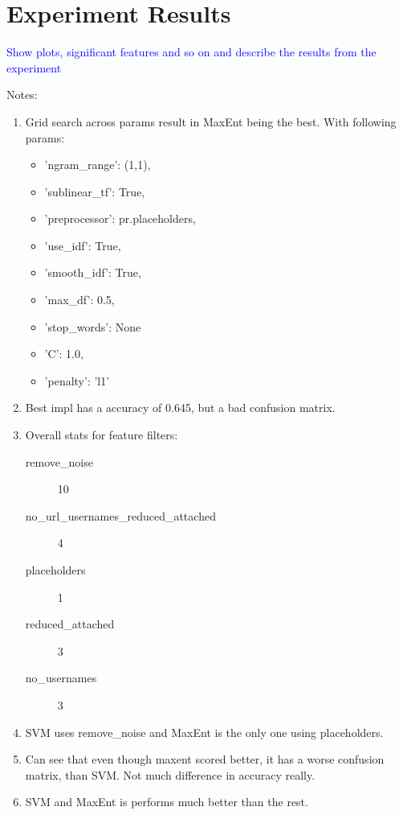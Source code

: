 \section{Experiment Results}
\textcolor{blue}{Show plots, significant features and so on and describe the results from the experiment}

Notes:
\begin{enumerate}
\item Grid search across params result in MaxEnt being the best. With following params:
	\begin{itemize}
		\item 'ngram\_range': (1,1),
		\item  'sublinear\_tf': True,
		\item  'preprocessor': pr.placeholders,
		\item  'use\_idf': True,
		\item  'smooth\_idf': True,
		\item  'max\_df': 0.5,
		\item  'stop\_words': None
	\end{itemize}
	\begin{itemize}
		\item 'C': 1.0,
		\item 'penalty': 'l1'
	\end{itemize}

\item Best impl has a accuracy of 0.645, but a bad confusion matrix.

\item Overall stats for feature filters:
	\begin{description}
		\item[remove\_noise] 10
		\item[no\_url\_usernames\_reduced\_attached] 4
		\item[placeholders] 1
		\item[reduced\_attached] 3
		\item[no\_usernames] 3
	\end{description}

\item SVM uses remove\_noise and MaxEnt is the only one using placeholders. 

\item Can see that even though maxent scored better, it has a worse confusion matrix, than SVM. Not much difference in accuracy really. 

\item SVM and MaxEnt is performs much better than the rest. 
\end{enumerate}


